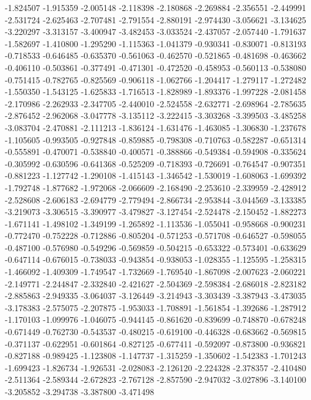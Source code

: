 -1.824507
-1.915359
-2.005148
-2.118398
-2.180868
-2.269884
-2.356551
-2.449991
-2.531724
-2.625463
-2.707481
-2.791554
-2.880191
-2.974430
-3.056621
-3.134625
-3.220297
-3.313157
-3.400947
-3.482453
-3.033524
-2.437057
-2.057440
-1.791637
-1.582697
-1.410800
-1.295290
-1.115363
-1.041379
-0.930341
-0.830071
-0.813193
-0.718533
-0.646485
-0.635370
-0.561063
-0.462570
-0.521865
-0.481698
-0.463662
-0.406110
-0.503861
-0.377491
-0.471301
-0.472520
-0.458953
-0.560113
-0.538080
-0.751415
-0.782765
-0.825569
-0.906118
-1.062766
-1.204417
-1.279117
-1.272482
-1.550350
-1.543125
-1.625833
-1.716513
-1.828989
-1.893376
-1.997228
-2.081458
-2.170986
-2.262933
-2.347705
-2.440010
-2.524558
-2.632771
-2.698964
-2.785635
-2.876452
-2.962068
-3.047778
-3.135112
-3.222415
-3.303268
-3.399503
-3.485258
-3.083704
-2.470881
-2.111213
-1.836124
-1.631476
-1.463085
-1.306830
-1.237678
-1.105605
-0.993505
-0.927848
-0.859885
-0.798308
-0.710763
-0.582287
-0.651314
-0.555891
-0.470071
-0.538840
-0.400571
-0.388866
-0.549384
-0.594908
-0.335624
-0.305992
-0.630596
-0.641368
-0.525209
-0.718393
-0.726691
-0.764547
-0.907351
-0.881223
-1.127742
-1.290108
-1.415143
-1.346542
-1.530019
-1.608063
-1.699392
-1.792748
-1.877682
-1.972068
-2.066609
-2.168490
-2.253610
-2.339959
-2.428912
-2.528608
-2.606183
-2.694779
-2.779494
-2.866734
-2.953844
-3.044569
-3.133385
-3.219073
-3.306515
-3.390977
-3.479827
-3.127454
-2.524478
-2.150452
-1.882273
-1.671141
-1.498102
-1.349199
-1.265892
-1.113536
-1.055041
-0.958668
-0.900231
-0.772470
-0.752228
-0.712886
-0.805204
-0.571253
-0.571708
-0.646527
-0.598055
-0.487100
-0.576980
-0.549296
-0.569859
-0.504215
-0.653322
-0.573401
-0.633629
-0.647114
-0.676015
-0.738033
-0.943854
-0.938053
-1.028355
-1.125595
-1.258315
-1.466092
-1.409309
-1.749547
-1.732669
-1.769540
-1.867098
-2.007623
-2.060221
-2.149771
-2.244847
-2.332840
-2.421627
-2.504369
-2.598384
-2.686018
-2.823182
-2.885863
-2.949335
-3.064037
-3.126449
-3.214943
-3.303439
-3.387943
-3.473035
-3.178383
-2.575075
-2.207875
-1.953033
-1.708891
-1.561854
-1.392686
-1.287912
-1.170103
-1.099976
-1.046075
-0.944145
-0.861620
-0.839699
-0.748870
-0.678248
-0.671449
-0.762730
-0.543537
-0.480215
-0.619100
-0.446328
-0.683662
-0.569815
-0.371137
-0.622951
-0.601864
-0.827125
-0.677411
-0.592097
-0.873800
-0.936821
-0.827188
-0.989425
-1.123808
-1.147737
-1.315259
-1.350602
-1.542383
-1.701243
-1.699423
-1.826734
-1.926531
-2.028083
-2.126120
-2.224328
-2.378357
-2.410480
-2.511364
-2.589344
-2.672823
-2.767128
-2.857590
-2.947032
-3.027896
-3.140100
-3.205852
-3.294738
-3.387800
-3.471498
